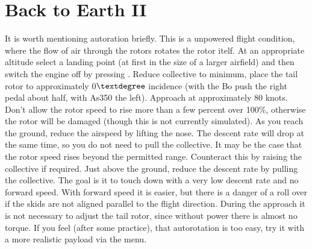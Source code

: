 
\section{Back to Earth II}

It is worth mentioning autoration briefly. This is a unpowered flight condition, 
where the flow of air through the rotors rotates the rotor itelf. At an 
appropriate altitude select a landing point (at first in the size of a larger 
airfield) and then switch the engine off by pressing \key{\{}. Reduce 
collective to minimum, place the tail rotor to approximately 0$\textdegree$ 
incidence (with the Bo push the right pedal about half, with As350 the left). 
Approach at approximately 80 knots. Don't allow the rotor speed to rise more 
than a few percent over 100\%, otherwise the rotor will be damaged (though 
this is not currently simulated). As you reach the ground, reduce the airspeed 
by lifting the nose. The descent rate will drop at the same time, so you do 
not need to pull the collective. It may be the case that the rotor speed 
rises beyond the permitted range. Counteract this by raising the collective 
if required. Just above the ground, reduce the descent rate by pulling the 
collective. The goal is it to touch down with a very low descent rate and no 
forward speed. With forward speed it is easier, but there is a danger of a 
roll over if the skids are not aligned parallel to the flight direction. 
During the approach it is not necessary to adjust the tail rotor, since 
without power there is almost no torque. If you feel (after some practice), 
that autorotation is too easy, try it with a more realistic payload via 
the  menu. 

\fi












